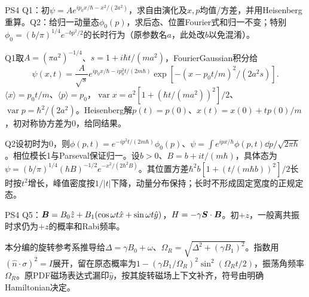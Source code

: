 \begin{exercise}
PS4 Q1：初$\psi=Ae^{ip_0x/\hbar-x^2/(2a^2)}$，求自由演化及$x,p$均值/方差，并用Heisenberg重算。Q2：给归一动量态$\phi_0(p)$，求后态、位置Fourier式和归一不变；特别$\phi_0=(b/\pi)^{1/4}e^{-bp^2/2}$的长时行为（原参数名$a$，此处改$b$以免混淆）。
\end{exercise}
\begin{solution}
Q1取$A=(\pi a^2)^{-1/4}$、$s=1+i\hbar t/(ma^2)$，FourierGaussian积分给
\[
 \psi(x,t)=\frac A{\sqrt s}
 e^{ip_0x/\hbar-ip_0^2t/(2m\hbar)}
 \exp[-(x-p_0t/m)^2/(2a^2s)].
\]
$\langle x\rangle=p_0t/m$、$\langle p\rangle=p_0$，$\operatorname{var}x=a^2[1+(\hbar t/(ma^2))^2]/2$、$\operatorname{var}p=\hbar^2/(2a^2)$。Heisenberg解$p(t)=p(0)$、$x(t)=x(0)+tp(0)/m$，初对称协方差为0，给同结果。

Q2设初时为0，则$\phi(p,t)=e^{-ip^2t/(2m\hbar)}\phi_0(p)$、$\psi=\int e^{ipx/\hbar}\phi(p,t)\dd p/\sqrt{2\pi\hbar}$。相位模长1与Parseval保证归一。设$b>0$、$B=b+it/(m\hbar)$，具体态为$\psi=(b/\pi)^{1/4}(\hbar B)^{-1/2}e^{-x^2/(2\hbar^2B)}$。其位置方差$\hbar^2 b[1+(t/(m\hbar b))^2]/2$长时按$t^2$增长，峰值密度按$1/|t|$下降，动量分布保持；长时不形成固定宽度的正规定态。
\end{solution}
\begin{exercise}
PS4 Q5：$\boldsymbol{B}=B_0\hat z+B_1(\cos\omega t\hat x+\sin\omega t\hat y)$，$H=-\gamma\boldsymbol{S}\cdot\boldsymbol{B}$。初$+z$，一般离共振时求仍为$+z$的概率和Rabi频率。
\end{exercise}
\begin{solution}
本分编的旋转参考系推导给$\Delta=\gamma B_0+\omega$、$\Omega_R=\sqrt{\Delta^2+(\gamma B_1)^2}$。指数用$(\hat n\cdot\sigma)^2=I$展开，留在原态概率为$1-(\gamma B_1/\Omega_R)^2\sin^2(\Omega_Rt/2)$，振荡角频率$\Omega_R$。原PDF磁场表达式漏印$\hat y$，按其旋转磁场上下文补齐，符号由明确Hamiltonian决定。
\end{solution}


